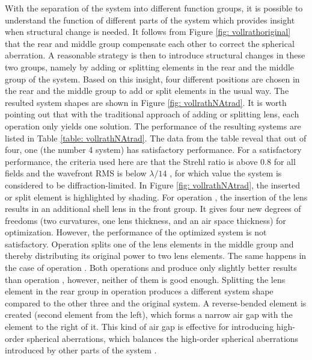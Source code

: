 With the separation of the system into different function groups, it is possible to understand the function of different parts of the system which provides insight when structural change is needed. It follows from Figure \ref{fig: vollrathoriginal} that the rear and middle group compensate each other to correct the spherical aberration. A reasonable strategy is then to introduce structural changes in these two groups, namely by adding or splitting elements in the rear and the middle group of the system. Based on this insight, four different positions are chosen in the rear and the middle group to add or split elements in the usual way. The resulted system shapes are shown in Figure \ref{fig: vollrathNAtrad}. It is worth pointing out that with the traditional approach of adding or splitting lens, each operation only yields one solution. The performance of the resulting systems are listed in Table \ref{table: vollrathNAtrad}. The data from the table reveal that out of four, one (the number 4 system) has satisfactory performance. For a satisfactory performance, the criteria used here are that the Strehl ratio is above 0.8 for all fields and the wavefront RMS is below $\lambda/14$ \cite{patentvollrath}, for which value the system is considered to be diffraction-limited. In Figure \ref{fig: vollrathNAtrad}, the inserted or split element is highlighted by shading. For operation , the insertion of the lens results in an additional shell lens in the front group. It gives four new degrees of freedoms (two curvatures, one lens thickness, and an air space thickness) for optimization. However, the performance of the optimized system is not satisfactory. Operation  splits one of the lens elements in the middle group and thereby distributing its original power to two lens elements. The same happens in the case of operation . Both operations  and  produce only slightly better results than operation , however, neither of them is good enough. Splitting the lens element in the rear group in operation  produces a different system shape compared to the other three and the original system. A reverse-bended element is created (second element from the left), which forms a narrow air gap with the element to the right of it. This kind of air gap is effective for introducing high-order spherical aberrations, which balances the high-order spherical aberrations introduced by other parts of the system \cite{ZhangGross+2019+349+384}. 

